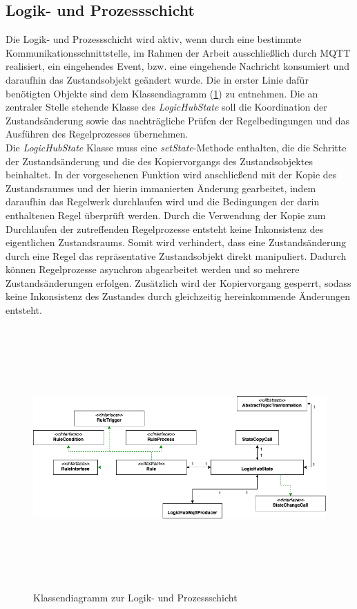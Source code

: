     \subsection{Logik- und Prozessschicht}
    \label{subsec:logikschicht}
    Die Logik- und Prozessschicht wird aktiv, wenn durch eine bestimmte Kommunikationsschnittstelle, im Rahmen der Arbeit ausschließlich durch \acs{MQTT} realisiert, ein eingehendes 
    Event, bzw. eine eingehende Nachricht konsumiert und daraufhin das Zustandsobjekt geändert wurde. Die in erster Linie dafür benötigten Objekte sind dem 
    Klassendiagramm (\ref{fig:patternlogik}) zu entnehmen. Die an zentraler Stelle stehende Klasse des \textit{LogicHubState} soll die Koordination 
    der Zustandsänderung sowie das nachträgliche Prüfen der Regelbedingungen und das Ausführen des Regelprozesses übernehmen. 
    \\
    Die \textit{LogicHubState} Klasse muss eine \textit{setState}-Methode enthalten, die die Schritte der Zustandsänderung und die des Kopiervorgangs des Zustandsobjektes beinhaltet. 
    In der vorgesehenen Funktion wird anschließend mit der Kopie des Zustandsraumes und der hierin immanierten Änderung gearbeitet, indem daraufhin das Regelwerk durchlaufen wird und die Bedingungen 
    der darin enthaltenen Regel überprüft werden. Durch die Verwendung der Kopie zum Durchlaufen der zutreffenden Regelprozesse entsteht keine Inkonsistenz des eigentlichen Zustandsraums.  
    Somit wird verhindert, dass eine Zustandsänderung durch eine Regel das repräsentative Zustandsobjekt direkt manipuliert. Dadurch können Regelprozesse asynchron abgearbeitet werden 
    und so mehrere Zustandsänderungen erfolgen. Zusätzlich wird der Kopiervorgang gesperrt, sodass keine Inkonsistenz des Zustandes durch gleichzeitig hereinkommende Änderungen entsteht. 
    \begin{figure}[hbt!]
        \centering
        \includegraphics[width=14cm,height=10cm,keepaspectratio]{images/Logikschicht_final.png}
        \caption{Klassendiagramm zur Logik- und Prozessschicht}
        \label{fig:patternlogik}
    \end{figure}
